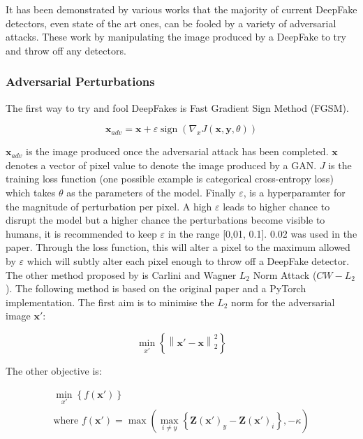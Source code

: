 \documentclass{article}
\begin{document}
It has been demonstrated by various works that the majority of current DeepFake detectors, even state of the art ones, can be fooled by a variety of adversarial attacks\cite{juefei2022countering}. These work by manipulating the image produced by a DeepFake to try and throw off any detectors.

\subsubsection{Adversarial Perturbations}

The first way to try and fool DeepFakes is Fast Gradient Sign Method (FGSM)\cite{pertubations}.

\begin{equation}
    \mathbf{x}_{adv} = \mathbf{x} + \varepsilon \operatorname{sign} (\nabla _x J( \mathbf{x},\mathbf{y}, \theta ))
\end{equation}

$\mathbf{x}_{adv}$ is the image produced once the adversarial attack has been completed. $\mathbf{x}$ denotes a vector of pixel value to denote the image produced by a GAN. $J$ is the training loss function (one possible example is categorical cross-entropy loss) which takes $\theta$ as the parameters of the model. Finally $\varepsilon$, is a hyperparamter for the magnitude of perturbation per pixel. A high $\varepsilon$ leads to higher chance to disrupt the model but a higher chance the perturbations become visible to humans, it is recommended to keep $\varepsilon$ in the range [0,01, 0.1]. 0.02 was used in the paper\cite{pertubations}. Through the loss function, this will alter a pixel to the maximum allowed by $\varepsilon$ which will subtly alter each pixel enough to throw off a DeepFake detector.\\

The other method proposed by \cite{pertubations} is Carlini and Wagner $L_2$ Norm Attack ($CW-L_2$). The following method is based on the original paper\cite{carlini2017towards} and a PyTorch implementation\cite{cwl2python}. The first aim is to minimise the $L_2$ norm for the adversarial image $\mathbf{x}'$:

\begin{equation}
\label{eq:l2_norm}
    \mathop {\min} \limits_{x'} \left\{ \left\| \mathbf{x}' - \mathbf{x} \right\|_2^2 \right\}
\end{equation}

The other objective is:

\begin{equation}
\label{eq:min_f(x')}
\begin{array}{c} 
    \mathop {\min} \limits_{x'} \left\{ f\left( \mathbf{x}' \right) \right\} \\
    \text{where } f\left( \mathbf{x}' \right) = \max \left( \max_{i \ne y} \left\{ \mathbf{Z} \left( \mathbf{x}' \right)_y - \mathbf{Z} \left( \mathbf{x}' \right)_i \right\}, - \kappa \right)
\end{array}
\end{equation}
\end{document}
